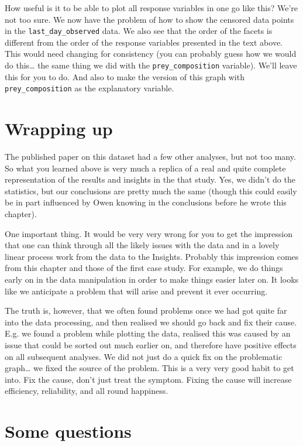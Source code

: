 \documentclass[]{book}
\begin{document}
How useful is it to be able to plot all response variables in one go like this? We're not too sure. We now have the problem of how to show the censored data points in the \texttt{last\_day\_observed} data. We also see that the order of the facets is different from the order of the response variables presented in the text above. This would need changing for consistency (you can probably guess how we would do this\ldots{} the same thing we did with the \texttt{prey\_composition} variable). We'll leave this for you to do. And also to make the version of this graph with \texttt{prey\_composition} as the explanatory variable.

\hypertarget{wrapping-up-1}{%
\section{Wrapping up}\label{wrapping-up-1}}

The published paper on this dataset had a few other analyses, but not too many. So what you learned above is very much a replica of a real and quite complete representation of the results and insights in the that study. Yes, we didn't do the statistics, but our conclusions are pretty much the same (though this could easily be in part influenced by Owen knowing in the conclusions before he wrote this chapter).

One important thing. It would be very very wrong for you to get the impression that one can think through all the likely issues with the data and in a lovely linear process work from the data to the Insights. Probably this impression comes from this chapter and those of the first case study. For example, we do things early on in the data manipulation in order to make things easier later on. It looks like we anticipate a problem that will arise and prevent it ever occurring.

The truth is, however, that we often found problems once we had got quite far into the data processing, and then realised we should go back and fix their cause. E.g. we found a problem while plotting the data, realised this was caused by an issue that could be sorted out much earlier on, and therefore have positive effects on all subsequent analyses. We did not just do a quick fix on the problematic graph\ldots{} we fixed the source of the problem. This is a very very good habit to get into. Fix the cause, don't just treat the symptom. Fixing the cause will increase efficiency, reliability, and all round happiness.

\hypertarget{some-questions-1}{%
\section{Some questions}\label{some-questions-1}}
\end{document}
